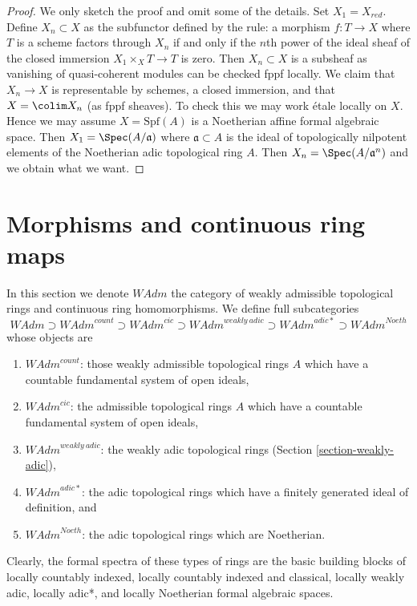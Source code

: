 \begin{proof}
We only sketch the proof and omit some of the details.
Set $X_1 = X_{red}$. Define $X_n \subset X$ as the subfunctor
defined by the rule: a morphism $f : T \to X$ where $T$ is a scheme factors
through $X_n$ if and only if the $n$th power of the ideal sheaf
of the closed immersion $X_1 \times_X T \to T$ is zero. Then $X_n \subset X$
is a subsheaf as vanishing of quasi-coherent modules can be checked
fppf locally. We claim that $X_n \to X$ is representable by schemes,
a closed immersion, and that $X = \colim X_n$ (as fppf sheaves).
To check this we may work \'etale locally on $X$. Hence we may assume
$X = \text{Spf}(A)$ is a Noetherian affine formal algebraic space.
Then $X_1 = \Spec(A/\mathfrak a)$ where $\mathfrak a \subset A$
is the ideal of topologically nilpotent elements of the Noetherian
adic topological ring $A$. Then $X_n = \Spec(A/\mathfrak a^n)$
and we obtain what we want.
\end{proof}









\section{Morphisms and continuous ring maps}
\label{section-morphisms-rings}

\noindent
In this section we denote $\textit{WAdm}$ the category of
weakly admissible topological rings and continuous ring homomorphisms.
We define full subcategories
$$
\textit{WAdm} \supset
\textit{WAdm}^{count} \supset
\textit{WAdm}^{cic} \supset
\textit{WAdm}^{weakly\ adic} \supset
\textit{WAdm}^{adic*} \supset
\textit{WAdm}^{Noeth}
$$
whose objects are
\begin{enumerate}
\item $\textit{WAdm}^{count}$: those weakly admissible topological rings
$A$ which have a countable fundamental system of open ideals,
\item $\textit{WAdm}^{cic}$: the admissible topological rings
$A$ which have a countable fundamental system of open ideals,
\item $\textit{WAdm}^{weakly\ adic}$: the weakly adic topological rings
(Section \ref{section-weakly-adic}),
\item $\textit{WAdm}^{adic*}$: the adic topological rings which have
a finitely generated ideal of definition, and
\item $\textit{WAdm}^{Noeth}$: the adic topological rings which
are Noetherian.
\end{enumerate}
Clearly, the formal spectra of these types of rings are the basic
building blocks of
locally countably indexed,
locally countably indexed and classical,
locally weakly adic,
locally adic*, and
locally Noetherian formal algebraic spaces.

